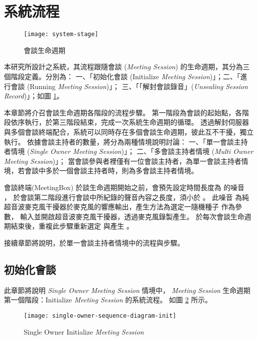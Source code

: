 \section{系統流程}
\label{sec:system-flow}

\begin{figure}[H]
    \centering
    \texttt{[image: system-stage]}
    \caption{會談生命週期}
    \label{fig:system-stage}
\end{figure}

    本研究所設計之系統，其流程跟隨會談 ({\it Meeting Session}) 的生命週期，其分為三個階段定義。分別為：
一、「初始化會談 (Initialize {\it Meeting Session})」；二、「進行會談 (Running {\it Meeting Session})」；
三、「「解封會談錄音」({\it Unsealing Session Record})」；如圖 \ref{fig:system-stage}。

    本章節將介召會談生命週期各階段的流程步驟。
第一階段為會談的起始點，各階段依序執行，於第三階段結束，完成一次系統生命週期的循環。
透過解封伺服器與多個會談終端配合，系統可以同時存在多個會談生命週期，彼此互不干擾，獨立執行。
依據會談主持者的數量，將分為兩種情境說明討論：
一、「單一會談主持者情境 ({\it Single Owner Meeting Session})」；
二、「多會談主持者情境 ({\it Multi Owner Meeting Session})」；
當會談參與者裡僅有一位會談主持者，為單一會談主持者情境，若會談中多於一個會談主持者時，則為多會談主持者情境。

    會談終端(MeetingBox) 於談生命週期開始之前，會預先設定時間長度為 \DEFtimeMAX 的噪音 \DEFrecN，
於會談第二階段進行會談中所紀錄的聲音內容之長度，須小於  \DEFtimeMAX。
此噪音 \DEFrecN 為純超音波麥克風干擾器於麥克風的響應輸出，產生方法為選定一隨機種子 \DEFseed 作為參數，
輸入並開啟超音波麥克風干擾器，透過麥克風錄製產生。
於每次會談生命週期結束後，重複此步驟重新選定 \DEFseed 與產生 \DEFrecN。

    接續章節將說明，於單一會談主持者情境中的流程與步驟。


\subsection{初始化會談}
\label{subsec:initialize}

    此章節將說明 {\it Single Owner Meeting Session} 情境中，
{\it Meeting Session} 生命週期第一個階段：Initialize {\it Meeting Session} 的系統流程。
如圖 \ref{fig:s-o-init} 所示。

\begin{figure}[H]
    \centering
    \texttt{[image: single-owner-sequence-diagram-init]}
    \caption{Single Owner Initialize {\it Meeting Session}}
    \label{fig:s-o-init}
\end{figure}


